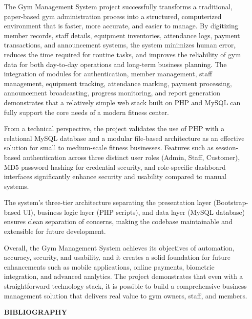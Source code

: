 \documentclass[12pt,a4paper]{report}
\begin{document}
\newpage
The Gym Management System project successfully transforms a traditional, paper-based gym administration process into a structured, computerized environment that is faster, more accurate, and easier to manage. By digitizing member records, staff details, equipment inventories, attendance logs, payment transactions, and announcement systems, the system minimizes human error, reduces the time required for routine tasks, and improves the reliability of gym data for both day-to-day operations and long-term business planning. The integration of modules for authentication, member management, staff management, equipment tracking, attendance marking, payment processing, announcement broadcasting, progress monitoring, and report generation demonstrates that a relatively simple web stack built on PHP and MySQL can fully support the core needs of a modern fitness center.

From a technical perspective, the project validates the use of PHP with a relational MySQL database and a modular file-based architecture as an effective solution for small to medium-scale fitness businesses. Features such as session-based authentication across three distinct user roles (Admin, Staff, Customer), MD5 password hashing for credential security, and role-specific dashboard interfaces significantly enhance security and usability compared to manual systems.

The system's three-tier architecture separating the presentation layer (Bootstrap-based UI), business logic layer (PHP scripts), and data layer (MySQL database) ensures clean separation of concerns, making the codebase maintainable and extensible for future development. 

Overall, the Gym Management System achieves its objectives of automation, accuracy, security, and usability, and it creates a solid foundation for future enhancements such as mobile applications, online payments, biometric integration, and advanced analytics. The project demonstrates that even with a straightforward technology stack, it is possible to build a comprehensive business management solution that delivers real value to gym owners, staff, and members.

\newpage
\vspace*{\fill}
\begin{center}
{\LARGE \textbf{BIBLIOGRAPHY}}
\end{center}
\vspace*{\fill}
\end{document}
